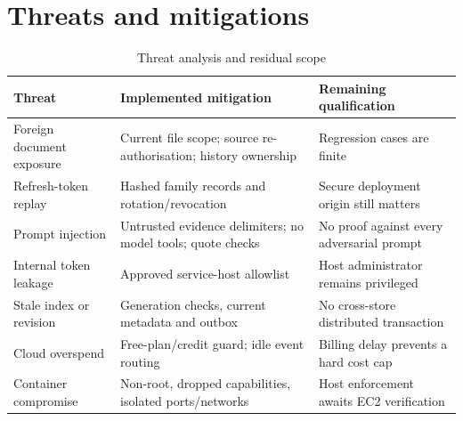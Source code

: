 \section{Threats and mitigations}
\par\begin{table}[htbp]\caption{Threat analysis and residual scope}\small\begin{tabularx}{\linewidth}{p{.25\linewidth}YY}\toprule Threat&Implemented mitigation&Remaining qualification\\\midrule
Foreign document exposure&Current file scope; source re-authorisation; history ownership&Regression cases are finite\\
Refresh-token replay&Hashed family records and rotation/revocation&Secure deployment origin still matters\\
Prompt injection&Untrusted evidence delimiters; no model tools; quote checks&No proof against every adversarial prompt\\
Internal token leakage&Approved service-host allowlist&Host administrator remains privileged\\
Stale index or revision&Generation checks, current metadata and outbox&No cross-store distributed transaction\\
Cloud overspend&Free-plan/credit guard; idle event routing&Billing delay prevents a hard cost cap\\
Container compromise&Non-root, dropped capabilities, isolated ports/networks&Host enforcement awaits EC2 verification\\\bottomrule\end{tabularx}\end{table}\par

